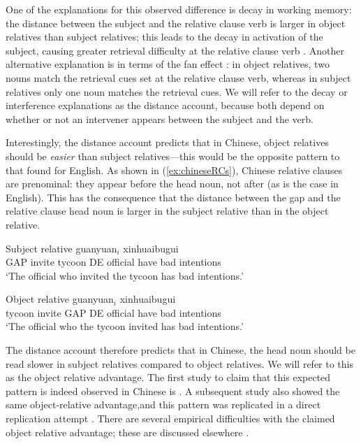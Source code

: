 \documentclass{cambridge7A}\usepackage[]{graphicx}\usepackage[]{color}
\begin{document}
One of the explanations for this observed difference is decay in working memory: the distance between the subject and the relative clause verb is larger in object relatives than subject relatives; this leads to the decay in activation of the subject, causing greater retrieval difficulty at the relative clause verb \citep{Gibson2000}. Another alternative explanation is in terms of the fan effect \citep{LewisVasishth2005}: in object relatives, two nouns match the retrieval cues  set at the relative clause verb, whereas in subject relatives only one noun matches the retrieval cues. We will refer to the decay or interference explanations as the distance account, because both depend on whether or not an intervener appears between the subject and the verb.

Interestingly, the distance account predicts that in Chinese, object relatives should be \textit{easier} than subject relatives---this would be the opposite pattern to that found for English. As shown in (\ref{ex:chineseRCs}), Chinese relative clauses are prenominal: they appear before the head noun, not after (as is the case in English). This has the consequence that the distance between the  gap and the relative clause head noun is larger in the subject relative than in the object relative. 

\begin{exe}
\ex  \label{ex:chineseRCs}
\begin{xlist}
\item
Subject relative
 guanyuan$_i$ xinhuaibugui \\
GAP invite tycoon DE official {have bad intentions}\\
\glt `The official who invited the tycoon has bad intentions.’
\item 
Object relative 
 guanyuan$_i$ xinhuaibugui \\
tycoon invite GAP DE official { have bad intentions}\\
\glt `The official who the tycoon invited has bad intentions.’
\end{xlist}
\end{exe}

The distance account therefore predicts that in Chinese, the head noun should be read slower in subject relatives compared to object relatives. We will refer to this as the object relative advantage. The first study to claim that this expected pattern is indeed observed in Chinese is \cite{HsiaoGibson2003}. A  subsequent study \citep{gibsonwu} also showed the same object-relative advantage,and this pattern was replicated in a  direct replication attempt \cite{VasishthetalPLoSOne2013}.  There are several empirical difficulties  with the claimed object relative advantage; these are discussed elsewhere \citep{VasishthetalPLoSOne2013,WuKaiserVasishth2017,JagerChenLi2015}. 
\end{document}
